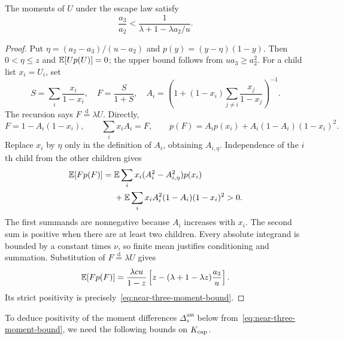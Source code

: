 \begin{lemma}\label{lem:near-three-moments}
The moments of $U$ under the escape law satisfy
\begin{equation}\label{eq:near-three-moment-bound}
 \frac{a_3}{a_2}<\frac1{\lambda+1-\lambda a_2/u}.
\end{equation}
\end{lemma}
\begin{proof}
Put $\eta=(a_2-a_3)/(u-a_2)$ and $p(y)=(y-\eta)(1-y)$. Then $0<\eta\le z$ and $\mathbb E[Up(U)]=0$; the upper bound follows from $ua_3\ge a_2^2$. For a child list $x_i=U_i$, set
\[
 S=\sum_i\frac{x_i}{1-x_i},\quad F=\frac S{1+S},\quad
 A_i=\left(1+(1-x_i)\sum_{j\ne i}\frac{x_j}{1-x_j}\right)^{-1}.
\]
The recursion says $F\overset{\mathrm d}=\lambda U$. Directly,
\[
 F=1-A_i(1-x_i),\qquad \sum_i x_iA_i=F,
 \qquad p(F)=A_ip(x_i)+A_i(1-A_i)(1-x_i)^2.
\]
Replace $x_i$ by $\eta$ only in the definition of $A_i$, obtaining $A_{i,\eta}$. Independence of the $i$th child from the other children gives
\[
\begin{split}
 \mathbb E[Fp(F)]={}&\mathbb E\sum_i x_i(A_i^2-A_{i,\eta}^2)p(x_i)\\
 &+\mathbb E\sum_i x_iA_i^2(1-A_i)(1-x_i)^2>0.
\end{split}
\]
The first summands are nonnegative because $A_i$ increases with $x_i$. The second sum is positive when there are at least two children. Every absolute integrand is bounded by a constant times $\nu$, so finite mean justifies conditioning and summation. Substitution of $F\overset{\mathrm d}=\lambda U$ gives
\[
 \mathbb E[Fp(F)]
 =\frac{\lambda cu}{1-z}
 \left[z-(\lambda+1-\lambda z)\frac{a_3}{u}\right].
\]
Its strict positivity is precisely~\eqref{eq:near-three-moment-bound}.
\end{proof}

To deduce positivity of the moment differences $\Delta_s^{\mathrm{ass}}$ below from~\eqref{eq:near-three-moment-bound}, we need the following bounds on $K_{\rm cap}$.

